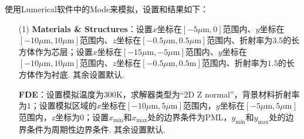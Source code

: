 \documentclass{assignment}
\begin{document}
\begin{sol}
    使用Lumerical软件中的Mode来模拟，设置和结果如下：
    \begin{itemize}
        \item[(1)] \textbf{Materials \& Structures}：设置$x$坐标在$[-5\mu\mathrm{m},0]$范围内、$y$坐标在$[-10\mu\mathrm{m},10\mu\mathrm{m}]$范围内、$z$坐标在$[-0.5\mu\mathrm{m},0.5\mu\mathrm{m}]$范围内、折射率为$3.5$的长方体作为芯层；设置$x$坐标在$[-15\mu\mathrm{m},-5\mu\mathrm{m}]$范围内、$y$坐标在$[-10\mu\mathrm{m},10\mu\mathrm{m}]$范围内、$z$坐标在$[-0.5\mu\mathrm{m},0.5\mathrm{m}]$范围内、折射率为$1.5$的长方体作为衬底. 其余设置默认.

        \textbf{FDE}：设置模拟温度为$300\mathrm{K}$，求解器类型为“2D Z normal”，背景材料折射率为$1$；设置模拟区域的$x$坐标在$[-10\mu\mathrm{m},5\mu\mathrm{m}]$范围内，$y$坐标在$[-5\mu\mathrm{m},5\mu\mathrm{m}]$范围内，$z$坐标为$0$；设置$x_{\min}$和$x_{\max}$处的边界条件为PML，$y_{\min}$和$y_{\max}$处的边界条件为周期性边界条件. 其余设置默认.


\end{itemize}
\end{sol}
\end{document}
